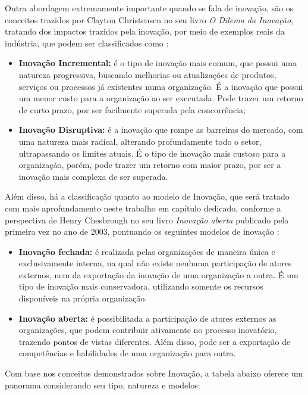 Outra abordagem extremamente importante quando se fala de inovação, são os conceitos trazidos por Clayton Christensen no seu livro \textit{O Dilema da Inovação}, tratando dos impactos trazidos pela inovação, por meio de exemplos reais da indústria, que podem ser classificados como \cite{christensen2012}:

\begin{itemize}
    \item \textbf{Inovação Incremental:} é o tipo de inovação mais comum, que possui uma natureza progressiva, buscando melhorias ou atualizações de produtos, serviços ou processos já existentes numa organização. É a inovação que possui um menor custo para a organização ao ser executada. Pode trazer um retorno de curto prazo, por ser facilmente superada pela concorrência;
    \item \textbf{Inovação Disruptiva:} é a inovação que rompe as barreiras do mercado, com uma natureza mais radical, alterando profundamente todo o setor, ultrapassando os limites atuais. É o tipo de inovação mais custoso para a organização, porém, pode trazer um retorno com maior prazo, por ser a inovação mais complexa de ser superada.
\end{itemize}

Além disso, há a classificação quanto ao modelo de Inovação, que será tratado com mais aprofundamento neste trabalho em capítulo dedicado, conforme a perspectiva de Henry Chesbrough no seu livro \textit{Inovação aberta} publicado pela primeira vez no ano de 2003, pontuando os seguintes modelos de inovação \cite{chesbrough2003}:

\begin{itemize}
    \item \textbf{Inovação fechada:} é realizada pelas organizações de maneira única e exclusivamente interna, na qual não existe nenhuma participação de atores externos, nem da exportação da inovação de uma organização a outra. É um tipo de inovação mais conservadora, utilizando somente os recursos disponíveis na própria organização.
    \item \textbf{Inovação aberta:} é possibilitada a participação de atores externos as organizações, que podem contribuir ativamente no processo inovatório, trazendo pontos de vistas diferentes. Além disso, pode ser a exportação de competências e habilidades de uma organização para outra.
\end{itemize}

Com base nos conceitos demonstrados sobre Inovação, a tabela abaixo oferece um panorama considerando seu tipo, natureza e modelos:



